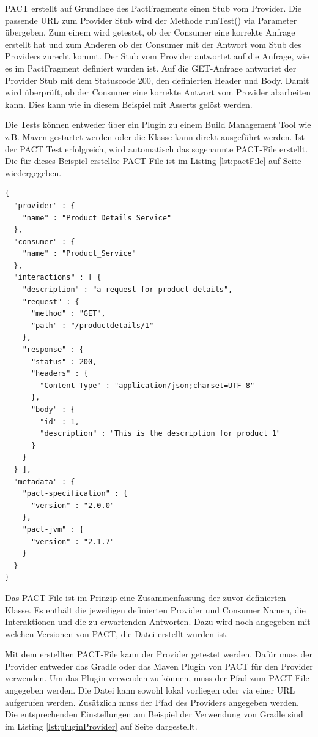 \documentclass{llncs}
\begin{document}
PACT erstellt auf Grundlage des PactFragments einen Stub vom Provider. Die passende URL zum Provider Stub wird der Methode runTest() via Parameter übergeben. Zum einem wird getestet, ob der Consumer eine korrekte Anfrage erstellt hat und zum Anderen ob der Consumer mit der Antwort vom Stub des Providers zurecht kommt. Der Stub vom Provider antwortet auf die Anfrage, wie es im PactFragment definiert wurden ist. Auf die GET-Anfrage antwortet der Provider Stub mit dem Statuscode 200, den definierten Header und Body. Damit wird überprüft, ob der Consumer eine korrekte Antwort vom Provider  abarbeiten kann. Dies kann wie in diesem Beispiel mit Asserts gelöst werden.

Die Tests können entweder über ein Plugin zu einem Build Management Tool wie z.B. Maven gestartet werden oder die Klasse kann direkt ausgeführt werden. Ist der PACT Test erfolgreich, wird automatisch das sogenannte PACT-File erstellt. Die für dieses Beispiel erstellte PACT-File ist im Listing \ref{lst:pactFile} auf Seite \pageref{lst:pactFile} wiedergegeben.
\lstset{language = Java}
\begin{lstlisting}[caption=PACT-File,label=lst:pactFile]
{
  "provider" : {
    "name" : "Product_Details_Service"
  },
  "consumer" : {
    "name" : "Product_Service"
  },
  "interactions" : [ {
    "description" : "a request for product details",
    "request" : {
      "method" : "GET",
      "path" : "/productdetails/1"
    },
    "response" : {
      "status" : 200,
      "headers" : {
        "Content-Type" : "application/json;charset=UTF-8"
      },
      "body" : {
        "id" : 1,
        "description" : "This is the description for product 1"
      }
    }
  } ],
  "metadata" : {
    "pact-specification" : {
      "version" : "2.0.0"
    },
    "pact-jvm" : {
      "version" : "2.1.7"
    }
  }
}
\end{lstlisting}

Das PACT-File ist im Prinzip eine Zusammenfassung der zuvor definierten Klasse. Es enthält die jeweiligen definierten Provider und Consumer Namen, die Interaktionen und die zu erwartenden Antworten. Dazu wird noch angegeben mit welchen Versionen von PACT, die Datei erstellt wurden ist.

Mit dem erstellten PACT-File kann der Provider getestet werden. Dafür muss der Provider entweder das Gradle oder das Maven Plugin von PACT für den Provider verwenden. Um das Plugin verwenden zu können, muss der Pfad zum PACT-File angegeben werden. Die Datei kann sowohl lokal vorliegen oder via einer URL aufgerufen werden. Zusätzlich muss der Pfad des Providers angegeben werden. Die entsprechenden Einstellungen am Beispiel der Verwendung von Gradle sind im Listing \ref{lst:pluginProvider} auf Seite \pageref{lst:pluginProvider} dargestellt.
\end{document}
